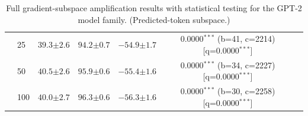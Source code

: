 \begin{table}[h!]
\begin{tabular}{l l cccc c}
 & 25 & $39.3 {\scriptstyle \pm 2.6}$ & $94.2 {\scriptstyle \pm 0.7}$ & $-54.9 {\scriptstyle \pm 1.7}$ & 0.0000$^{***}$ (b=41, c=2214) [q=0.0000$^{***}$] &  \\
 & 50 & $40.5 {\scriptstyle \pm 2.6}$ & $95.9 {\scriptstyle \pm 0.6}$ & $-55.4 {\scriptstyle \pm 1.6}$ & 0.0000$^{***}$ (b=34, c=2227) [q=0.0000$^{***}$] &  \\
 & 100 & $40.0 {\scriptstyle \pm 2.7}$ & $96.3 {\scriptstyle \pm 0.6}$ & $-56.3 {\scriptstyle \pm 1.6}$ & 0.0000$^{***}$ (b=30, c=2258) [q=0.0000$^{***}$] &  \\
\bottomrule
\end{tabular}
\caption{Full gradient-subspace amplification results with statistical testing for the GPT-2 model family. (Predicted-token subspace.)}
\label{tab:gradsubspace_amp_stats_predtoken_gpt2}
\end{table}
